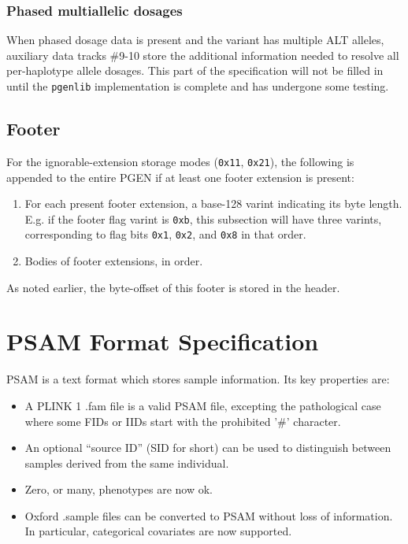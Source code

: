 \documentclass[8pt]{article}
\begin{document}
\subsubsection{Phased multiallelic dosages}

When phased dosage data is present and the variant has multiple ALT alleles,
auxiliary data tracks \#9-10 store the additional information needed to resolve
all per-haplotype allele dosages.  This part of the specification will not be
filled in until the \texttt{pgenlib} implementation is complete and has
undergone some testing.

\subsection{Footer}

For the ignorable-extension storage modes (\texttt{0x11}, \texttt{0x21}), the
following is appended to the entire PGEN if at least one footer extension is
present:

\begin{enumerate}
\item For each present footer extension, a base-128 varint indicating its byte
  length.  E.g. if the footer flag varint is \texttt{0xb}, this subsection will
  have three varints, corresponding to flag bits \texttt{0x1}, \texttt{0x2},
  and \texttt{0x8} in that order.
\item Bodies of footer extensions, in order.
\end{enumerate}

As noted earlier, the byte-offset of this footer is stored in the header.

\newpage
\section{PSAM Format Specification}

PSAM is a text format which stores sample information.  Its key properties are:

\begin{itemize}
\item A PLINK 1 .fam file is a valid PSAM file, excepting the pathological case
  where some FIDs or IIDs start with the prohibited '\#' character.
\item An optional ``source ID'' (SID for short) can be used to distinguish
  between samples derived from the same individual.
\item Zero, or many, phenotypes are now ok.
\item Oxford .sample files can be converted to PSAM without loss of
  information.  In particular, categorical covariates are now supported.
\end{itemize}
\end{document}
